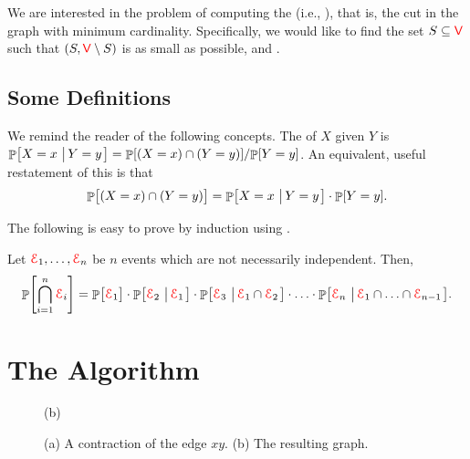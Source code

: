 We are interested in the problem of computing the  (i.e., ), that is, the cut in the
graph with minimum cardinality.  Specifically, we would like to find
the set $S\subseteq {\textcolor{red}{\mathsf{V}}}$ such that $(S, {\textcolor{red}{\mathsf{V}}} \setminus S)$
is as small as possible, and .



\subsection{Some Definitions}

We remind the reader of the following concepts.  The
 of $X$ given $Y$ is $ \Prob{X=x\sep{
      Y=y}} = \nfrac{\Prob{(X=x)\cap(Y=y)}}{\Prob{Y=y}}$.  An
equivalent, useful restatement of this is that
\begin{equation}
    \Prob{\bigl. (X=x)\cap(Y=y)} = \Prob{X=x\sep{ Y=y \MakeSBig }}
    \cdot \Prob{Y=y}.%
    \eqlab{conditional:probability}
\end{equation}


The following is easy to prove by induction using
.
\begin{lemma}
    Let ${\textcolor{red}{\EuScript{E}}}_{1},\ldots,{\textcolor{red}{\EuScript{E}}}_{n}$ be $n$ events which are not
    necessarily independent. Then,
    \begin{align*}
      \Prob{\Bigl. \bigcap_{i=1}^{n}\Event_{i}} %
      =%
      \Prob{\bigl. \Event_{1}} \cdot \Prob{\Event_{2}\sep{ \Event_{1}}}
      \cdot \Prob{\Event_{3}\sep{\Event_{1}\cap\Event_{2}}} \cdot \ldots \cdot
      \Prob{\Event_{n} \sep{ \Event_{1}\cap\ldots\cap\Event_{n-1}}}.
    \end{align*}
\end{lemma}


\section{The Algorithm}

\begin{figure}[t]
   \centering
                  {}{(b)}                  
   \caption{(a) A contraction of the edge $xy$. (b) The resulting graph.}
\end{figure}


